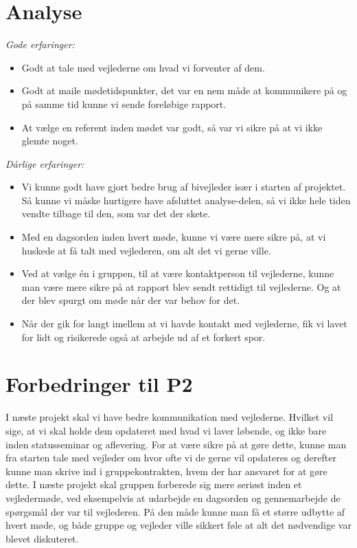 \section{Analyse}

\emph{Gode erfaringer:}
\begin{itemize}
\item	Godt at tale med vejlederne om hvad vi forventer af dem.

\item Godt at maile mødetidspunkter, det var en nem måde at kommunikere på og på samme tid kunne vi sende foreløbige rapport.

\item At vælge en referent inden mødet var godt, så var vi sikre på at vi ikke glemte noget.
\end{itemize}\emph{Dårlige erfaringer:}
\begin{itemize}
\item	Vi kunne godt have gjort bedre brug af bivejleder især i starten af projektet. Så kunne vi måske hurtigere have afsluttet analyse-delen, så vi ikke hele tiden vendte tilbage til den, som var det der skete.

\item	Med en dagsorden inden hvert møde, kunne vi være mere sikre på, at vi huskede at få talt med vejlederen, om alt det vi gerne ville.

\item	Ved at vælge én i gruppen, til at være kontaktperson til vejlederne, kunne man være mere sikre på at rapport blev sendt rettidigt til vejlederne. Og at der blev spurgt om møde når der var behov for det.

\item	Når der gik for langt imellem at vi havde kontakt med vejlederne, fik vi lavet for lidt og risikerede også at arbejde ud af et forkert spor.
\end{itemize}

\section{Forbedringer til P2}

I næste projekt skal vi have bedre kommunikation med vejlederne. Hvilket vil sige, at vi skal holde dem opdateret med hvad vi laver løbende, og ikke bare inden statusseminar og aflevering. For at være sikre på at gøre dette, kunne man fra starten tale med vejleder om hvor ofte vi de gerne vil opdateres og derefter kunne man skrive ind i gruppekontrakten, hvem der har ansvaret for at gøre dette. 
I næste projekt skal gruppen forberede sig mere seriøst inden et vejledermøde, ved eksempelvis at udarbejde en dagsorden og gennemarbejde de spørgsmål der var til vejlederen. På den måde kunne man få et større udbytte af hvert møde, og både gruppe og vejleder ville sikkert føle at alt det nødvendige var blevet diskuteret. 
